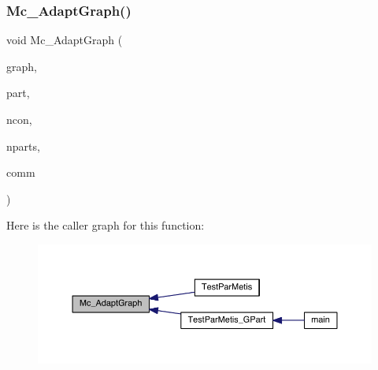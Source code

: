 \mbox{\label{a00422_a82918f9e496dea47e55d3f6b23db0449}} 
\subsubsection{\texorpdfstring{Mc\+\_\+\+Adapt\+Graph()}{Mc\_AdaptGraph()}}
{\footnotesize\ttfamily void Mc\+\_\+\+Adapt\+Graph (\begin{DoxyParamCaption}\item[{\hyperlink{a00734}{graph\+\_\+t} $\ast$}]{graph,  }\item[{\hyperlink{a00876_aaa5262be3e700770163401acb0150f52}{idx\+\_\+t} $\ast$}]{part,  }\item[{\hyperlink{a00876_aaa5262be3e700770163401acb0150f52}{idx\+\_\+t}}]{ncon,  }\item[{\hyperlink{a00876_aaa5262be3e700770163401acb0150f52}{idx\+\_\+t}}]{nparts,  }\item[{M\+P\+I\+\_\+\+Comm}]{comm }\end{DoxyParamCaption})}

Here is the caller graph for this function\+:\nopagebreak
\begin{figure}[H]
\begin{center}
\leavevmode
\includegraphics[width=350pt]{a00422_a82918f9e496dea47e55d3f6b23db0449_icgraph}
\end{center}
\end{figure}
